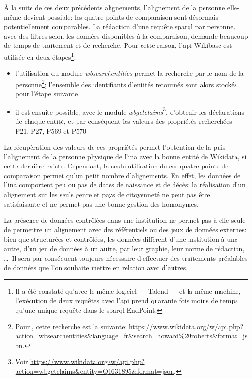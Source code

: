 À la suite de ces deux précédents alignements, l'alignement de la personne elle-même devient possible: les quatre points de comparaison sont désormais potentiellement comparables. La rédaction d'une requête \ac{sparql} par personne, avec des filtres selon les données disponibles à la comparaison, demande beaucoup de temps de traitement et de recherche. Pour cette raison, l'\ac{api} Wikibase est utilisée en deux étapes\footnote{Il a été constaté qu'avec le même logiciel --- Talend --- et la même machine, l'exécution de deux requêtes avec l'\ac{api} prend quarante fois moins de temps qu'une unique requête dans le \ac{sparql}-EndPoint.}:
\begin{itemize}
	\item l'utilisation du module \textit{wbsearchentities} permet la recherche par le nom de la personne\footnote{Pour , cette recherche est la suivante: \url{https://www.wikidata.org/w/api.php?action=wbsearchentities\&language=fr\&search=howard\%20roberts\&format=json}.}; l'ensemble des identifiants d'entités retournés sont alors stockés pour l'étape suivante
	\item il est ensuite possible, avec le module \textit{wbgetclaims}\footnote{Voir \url{https://www.wikidata.org/w/api.php?action=wbgetclaims\&entity=Q1631895\&format=json}.}, d'obtenir les déclarations de chaque entité, et par conséquent les valeurs des propriétés recherchées --- P21, P27, P569 et P570
\end{itemize}
La récupération des valeurs de ces propriétés permet l'obtention de la  puis l'alignement de la personne physique de l'\ac{ina} avec la bonne entité de Wikidata, si cette dernière existe.
Cependant, la seule utilisation de ces quatre points de comparaison permet qu'un petit nombre d'alignements. En effet, les données de l'\ac{ina} comportent peu ou pas de dates de naissance et de décès: la réalisation d'un alignement sur les seuls genre et pays de citoyenneté ne peut pas être satisfaisante et ne permet pas une bonne gestion des homonymes.

\bigskip
\bigskip
La présence de données contrôlées dans une institution ne permet pas à elle seule de permettre un alignement avec des référentiels ou des jeux de données externes: bien que structurées et contrôlées, les données diffèrent d'une institution à une autre, d'un jeu de données à un autre, par leur graphie, leur norme de rédaction, \dots~Il sera par conséquent toujours nécessaire d'effectuer des traitements préalables de données que l'on souhaite mettre en relation avec d'autres.
